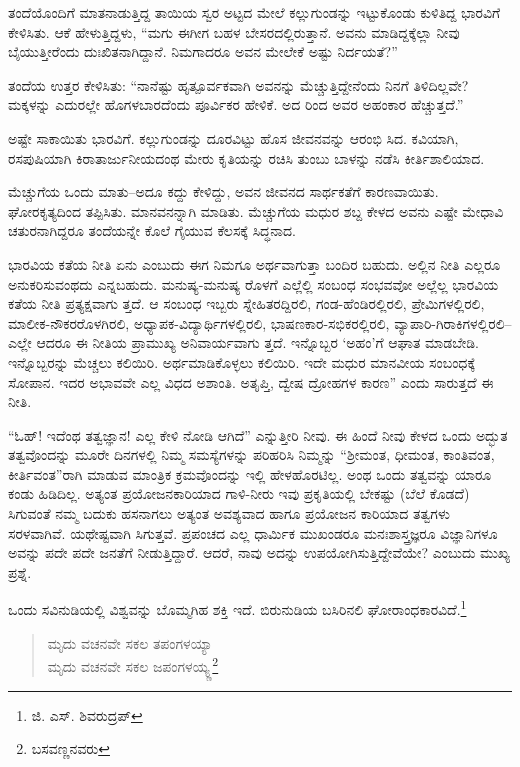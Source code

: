 ತಂದೆಯೊಂದಿಗೆ ಮಾತನಾಡುತ್ತಿದ್ದ ತಾಯಿಯ ಸ್ವರ ಅಟ್ಟದ ಮೇಲೆ ಕಲ್ಲುಗುಂಡನ್ನು ಇಟ್ಟುಕೊಂಡು ಕುಳಿತಿದ್ದ ಭಾರವಿಗೆ ಕೇಳಿಸಿತು. ಆಕೆ ಹೇಳುತ್ತಿದ್ದಳು, “ಮಗು ಈಗೀಗ ಬಹಳ ಬೇಸರದಲ್ಲಿರುತ್ತಾನೆ. ಅವನು ಮಾಡಿದ್ದಕ್ಕೆಲ್ಲಾ ನೀವು ಬೈಯುತ್ತೀರೆಂದು ದುಃಖಿತನಾಗಿದ್ದಾನೆ. ನಿಮಗಾದರೂ ಅವನ ಮೇಲೇಕೆ ಅಷ್ಟು ನಿರ್ದಯತೆ?”

ತಂದೆಯ ಉತ್ತರ ಕೇಳಿಸಿತು: “ನಾನೆಷ್ಟು ಹೃತ್ಪೂರ್ವಕವಾಗಿ ಅವನನ್ನು ಮೆಚ್ಚುತ್ತಿದ್ದೇನೆಂದು ನಿನಗೆ ತಿಳಿದಿಲ್ಲವೇ? ಮಕ್ಕಳನ್ನು ಎದುರಲ್ಲೇ ಹೊಗಳಬಾರದೆಂದು ಪೂರ್ವಿಕರ ಹೇಳಿಕೆ. ಅದ ರಿಂದ ಅವರ ಅಹಂಕಾರ ಹೆಚ್ಚುತ್ತದೆ.”

ಅಷ್ಟೇ ಸಾಕಾಯಿತು ಭಾರವಿಗೆ. ಕಲ್ಲುಗುಂಡನ್ನು ದೂರವಿಟ್ಟು ಹೊಸ ಜೀವನವನ್ನು ಆರಂಭಿ ಸಿದ. ಕವಿಯಾಗಿ, ರಸಪುಷಿಯಾಗಿ ಕಿರಾತಾರ್ಜುನೀಯದಂಥ ಮೇರು ಕೃತಿಯನ್ನು ರಚಿಸಿ ತುಂಬು ಬಾಳನ್ನು ನಡೆಸಿ ಕೀರ್ತಿಶಾಲಿಯಾದ.

ಮೆಚ್ಚುಗೆಯ ಒಂದು ಮಾತು–ಅದೂ ಕದ್ದು ಕೇಳಿದ್ದು, ಅವನ ಜೀವನದ ಸಾರ್ಥಕತೆಗೆ ಕಾರಣವಾಯಿತು. ಘೋರಕೃತ್ಯದಿಂದ ತಪ್ಪಿಸಿತು. ಮಾನವನನ್ನಾಗಿ ಮಾಡಿತು. ಮೆಚ್ಚುಗೆಯ ಮಧುರ ಶಬ್ದ ಕೇಳದ ಅವನು ಎಷ್ಟೇ ಮೇಧಾವಿ ಚತುರನಾಗಿದ್ದರೂ ತಂದೆಯನ್ನೇ ಕೊಲೆ ಗೈಯುವ ಕೆಲಸಕ್ಕೆ ಸಿದ್ಧನಾದ.

ಭಾರವಿಯ ಕತೆಯ ನೀತಿ ಏನು ಎಂಬುದು ಈಗ ನಿಮಗೂ ಅರ್ಥವಾಗುತ್ತಾ ಬಂದಿರ ಬಹುದು. ಅಲ್ಲಿನ ನೀತಿ ಎಲ್ಲರೂ ಅನುಕರಿಸುವಂಥದು ಎನ್ನಬಹುದು. ಮನುಷ್ಯ-ಮನುಷ್ಯ ರೊಳಗೆ ಎಲ್ಲೆಲ್ಲಿ ಸಂಬಂಧ ಸಂಭವವೋ ಅಲ್ಲೆಲ್ಲ ಭಾರವಿಯ ಕತೆಯ ನೀತಿ ಪ್ರತ್ಯಕ್ಷವಾಗು ತ್ತದೆ. ಆ ಸಂಬಂಧ ಇಬ್ಬರು ಸ್ನೇಹಿತರದ್ದಿರಲಿ, ಗಂಡ-ಹೆಂಡಿರಲ್ಲಿರಲಿ, ಪ್ರೇಮಿಗಳಲ್ಲಿರಲಿ, ಮಾಲೀಕ-ನೌಕರರೊಳಗಿರಲಿ, ಅಧ್ಯಾಪಕ-ವಿದ್ಯಾರ್ಥಿಗಳಲ್ಲಿರಲಿ, ಭಾಷಣಕಾರ-ಸಭಿಕರಲ್ಲಿರಲಿ, ವ್ಯಾಪಾರಿ-ಗಿರಾಕಿಗಳಲ್ಲಿರಲಿ–ಎಲ್ಲೇ ಆದರೂ ಈ ನೀತಿಯ ಪ್ರಾಮುಖ್ಯ ಅನಿವಾರ್ಯವಾಗು ತ್ತದೆ. ಇನ್ನೊಬ್ಬರ ‘ಅಹಂ’ಗೆ ಆಘಾತ ಮಾಡಬೇಡಿ. ಇನ್ನೊಬ್ಬರನ್ನು ಮೆಚ್ಚಲು ಕಲಿಯಿರಿ. ಅರ್ಥಮಾಡಿಕೊಳ್ಳಲು ಕಲಿಯಿರಿ. ಇದೇ ಮಧುರ ಮಾನವೀಯ ಸಂಬಂಧಕ್ಕೆ ಸೋಪಾನ. ಇದರ ಅಭಾವವೇ ಎಲ್ಲ ವಿಧದ ಅಶಾಂತಿ. ಅತೃಪ್ತಿ, ದ್ವೇಷ ದ್ರೋಹಗಳ ಕಾರಣ” ಎಂದು ಸಾರುತ್ತದೆ ಈ ನೀತಿ.

“ಓಹ್​! ಇದೆಂಥ ತತ್ವಜ್ಞಾನ! ಎಲ್ಲ ಕೇಳಿ ನೋಡಿ ಆಗಿದೆ” ಎನ್ನುತ್ತೀರಿ ನೀವು. ಈ ಹಿಂದೆ ನೀವು ಕೇಳದ ಒಂದು ಅದ್ಭುತ ತತ್ವವೊಂದನ್ನು ಮೂರೇ ದಿನಗಳಲ್ಲಿ ನಿಮ್ಮ ಸಮಸ್ಯೆಗಳನ್ನು ಪರಿಹರಿಸಿ ನಿಮ್ಮನ್ನು “ಶ‍್ರೀಮಂತ, ಧೀಮಂತ, ಕಾಂತಿವಂತ, ಕೀರ್ತಿವಂತ”ರಾಗಿ ಮಾಡುವ ಮಾಂತ್ರಿಕ ಕ್ರಮವೊಂದನ್ನು ಇಲ್ಲಿ ಹೇಳಹೊರಟಿಲ್ಲ. ಅಂಥ ಒಂದು ತತ್ವವನ್ನು ಯಾರೂ ಕಂಡು ಹಿಡಿದಿಲ್ಲ. ಅತ್ಯಂತ ಪ್ರಯೋಜನಕಾರಿಯಾದ ಗಾಳಿ-ನೀರು ಇವು ಪ್ರಕೃತಿಯಲ್ಲಿ ಬೇಕಷ್ಟು (ಬೆಲೆ ಕೊಡದೆ) ಸಿಗುವಂತೆ ನಮ್ಮ ಬದುಕು ಹಸನಾಗಲು ಅತ್ಯಂತ ಅವಶ್ಯವಾದ ಹಾಗೂ ಪ್ರಯೋಜನ ಕಾರಿಯಾದ ತತ್ವಗಳು ಸರಳವಾಗಿವೆ. ಯಥೇಷ್ಟವಾಗಿ ಸಿಗುತ್ತವೆ. ಪ್ರಪಂಚದ ಎಲ್ಲ ಧಾರ್ಮಿಕ ಮುಖಂಡರೂ ಮನಃಶಾಸ್ತ್ರಜ್ಞರೂ ವಿಜ್ಞಾನಿಗಳೂ ಅವನ್ನು ಪದೇ ಪದೇ ಜನತೆಗೆ ನೀಡುತ್ತಿದ್ದಾರೆ. ಆದರೆ, ನಾವು ಅದನ್ನು ಉಪಯೋಗಿಸುತ್ತಿದ್ದೇವೆಯೇ? ಎಂಬುದು ಮುಖ್ಯ ಪ್ರಶ್ನೆ.

ಒಂದು ಸವಿನುಡಿಯಲ್ಲಿ ವಿಶ್ವವನ್ನು ಬೊಮ್ಮಗಿಹ ಶಕ್ತಿ ಇದೆ. ಬಿರುನುಡಿಯ ಬಸಿರಿನಲಿ ಘೋರಾಂಧಕಾರವಿದೆ.\footnote{ಜಿ. ಎಸ್. ಶಿವರುದ್ರಪ್}

\begin{verse}
ಮೃದು ವಚನವೇ ಸಕಲ ತಪಂಗಳಯ್ಯಾ\\
 ಮೃದು ವಚನವೇ ಸಕಲ ಜಪಂಗಳಯ್ಯ್ಣ\footnote{ಬಸವಣ್ಣನವರು}
\end{verse}

